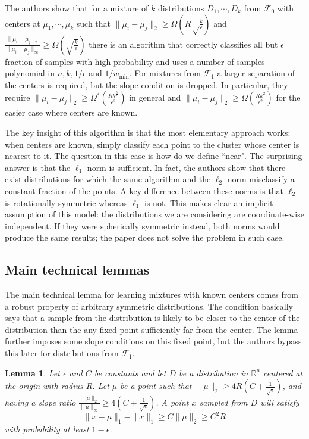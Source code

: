 \documentclass[11pt,letter]{article}
\newtheorem{lemma}{Lemma}
\begin{document}
The authors show that for a mixture of $k$ distributions $D_1, \cdots, D_k$ from $\mathcal F_0$ with centers at $\mu_1, \cdots, \mu_k$ such that $\| \mu_i - \mu_j \|_2 \geq \Omega\left(R \sqrt \frac k \epsilon \right)$ and $\frac{\|\mu_i - \mu_j\|_2}{\|\mu_i-\mu_j\|_{\infty}} \geq \Omega{\left( \sqrt{\frac{k}{\epsilon}}\right)}$ there is an algorithm that correctly classifies all but $\epsilon$ fraction of samples with high probability and uses a number of samples polynomial in $n, k, 1/\epsilon$ and $1/w_{\min}$. For mixtures from $\mathcal F_1$ a larger separation of the centers is required, but the slope condition is dropped. In particular, they require $\|\mu_i - \mu_j \|_2 \geq \Omega^* \left(\frac{Rk^{\frac{5}{2}}}{\epsilon^{2}}\right)$ in general and $\|\mu_i - \mu_j \|_2 \geq \Omega \left(\frac{Rk^{2}}{\epsilon^{2}}\right)$ for the easier case where centers are known.

The key insight of this algorithm is that the most elementary approach works: when centers are known, simply classify each point to the cluster whose center is nearest to it. The question in this case is how do we define ``near". The surprising answer is that the $\ell_1$ norm is sufficient. In fact, the authors show that there exist distributions for which the same algorithm and the $\ell_2$ norm misclassify a constant fraction of the points. A key difference between these norms is that $\ell_2$ is rotationally symmetric whereas $\ell_1$ is not. This makes clear an implicit assumption of this model: the distributions we are considering are coordinate-wise independent. If they were spherically symmetric instead, both norms would produce the same results; the paper does not solve the problem in such case. 

\subsection{Main technical lemmas}

The main technical lemma for learning mixtures with known centers comes from a robust property of arbitrary symmetric distributions. The condition basically says that a sample from the distribution is likely to be closer to the center of the distribution than the any fixed point sufficiently far from the center. The lemma further imposes some slope conditions on this fixed point, but the authors bypass this later for distributions from $\mathcal F_1$. 

\begin{lemma} \label{lem:heavy-tail-lem1}
Let $\epsilon$ and $C$ be constants and let $D$ be a distribution in $\mathbb R^n$ centered at the origin with radius $R$. Let $\mu$ be a point such that $\|\mu\|_2 \geq 4R(C+\frac{1}{\sqrt{\epsilon}})$, and having a slope ratio $\frac{\|\mu\|_2}{\|\mu\|_\infty} \geq 4(C+\frac{1}{\sqrt{\epsilon}})$. A point $x$ sampled from $D$ will satisfy 
\begin{equation*}
\|x-\mu\|_1 - \|x\|_1 \geq C\|\mu\|_2 \geq C^2R 
\end{equation*}
with probability at least $1-\epsilon$. 
 
\end{lemma} 
\end{document}
